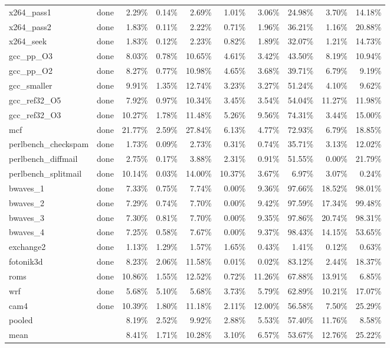 \documentclass[10pt,a4paper,landscape]{article}
\begin{document}
{\begin{longtable}{llrrrrrrrr}
x264\_pass1 & done & 2.29\% & 0.14\% & 2.69\% & 1.01\% & 3.06\% & 24.98\% & 3.70\% & 14.18\% \\
x264\_pass2 & done & 1.83\% & 0.11\% & 2.22\% & 0.71\% & 1.96\% & 36.21\% & 1.16\% & 20.88\% \\
x264\_seek & done & 1.83\% & 0.12\% & 2.23\% & 0.82\% & 1.89\% & 32.07\% & 1.21\% & 14.73\% \\
gcc\_pp\_O3 & done & 8.03\% & 0.78\% & 10.65\% & 4.61\% & 3.42\% & 43.50\% & 8.19\% & 10.94\% \\
gcc\_pp\_O2 & done & 8.27\% & 0.77\% & 10.98\% & 4.65\% & 3.68\% & 39.71\% & 6.79\% & 9.19\% \\
gcc\_smaller & done & 9.91\% & 1.35\% & 12.74\% & 3.23\% & 3.27\% & 51.24\% & 4.10\% & 9.62\% \\
gcc\_ref32\_O5 & done & 7.92\% & 0.97\% & 10.34\% & 3.45\% & 3.54\% & 54.04\% & 11.27\% & 11.98\% \\
gcc\_ref32\_O3 & done & 10.27\% & 1.78\% & 11.48\% & 5.26\% & 9.56\% & 74.31\% & 3.44\% & 15.00\% \\
mcf & done & 21.77\% & 2.59\% & 27.84\% & 6.13\% & 4.77\% & 72.93\% & 6.79\% & 18.85\% \\
perlbench\_checkspam & done & 1.73\% & 0.09\% & 2.73\% & 0.31\% & 0.74\% & 35.71\% & 3.13\% & 12.02\% \\
perlbench\_diffmail & done & 2.75\% & 0.17\% & 3.88\% & 2.31\% & 0.91\% & 51.55\% & 0.00\% & 21.79\% \\
perlbench\_splitmail & done & 10.14\% & 0.03\% & 14.00\% & 10.37\% & 3.67\% & 6.97\% & 3.07\% & 0.24\% \\
bwaves\_1 & done & 7.33\% & 0.75\% & 7.74\% & 0.00\% & 9.36\% & 97.66\% & 18.52\% & 98.01\% \\
bwaves\_2 & done & 7.29\% & 0.74\% & 7.70\% & 0.00\% & 9.42\% & 97.59\% & 17.34\% & 99.48\% \\
bwaves\_3 & done & 7.30\% & 0.81\% & 7.70\% & 0.00\% & 9.35\% & 97.86\% & 20.74\% & 98.31\% \\
bwaves\_4 & done & 7.25\% & 0.58\% & 7.67\% & 0.00\% & 9.37\% & 98.43\% & 14.15\% & 53.65\% \\
exchange2 & done & 1.13\% & 1.29\% & 1.57\% & 1.65\% & 0.43\% & 1.41\% & 0.12\% & 0.63\% \\
fotonik3d & done & 8.23\% & 2.06\% & 11.58\% & 0.01\% & 0.02\% & 83.12\% & 2.44\% & 18.37\% \\
roms & done & 10.86\% & 1.55\% & 12.52\% & 0.72\% & 11.26\% & 67.88\% & 13.91\% & 6.85\% \\
wrf & done & 5.68\% & 5.10\% & 5.68\% & 3.73\% & 5.79\% & 62.89\% & 10.21\% & 17.07\% \\
cam4 & done & 10.39\% & 1.80\% & 11.18\% & 2.11\% & 12.00\% & 56.58\% & 7.50\% & 25.29\% \\
\midrule
pooled &  & 8.19\% & 2.52\% & 9.92\% & 2.88\% & 5.53\% & 57.40\% & 11.76\% & 8.58\% \\
mean &  & 8.41\% & 1.71\% & 10.28\% & 3.10\% & 6.57\% & 53.67\% & 12.76\% & 25.22\% \\
\end{longtable}
}
\clearpage
\end{document}
